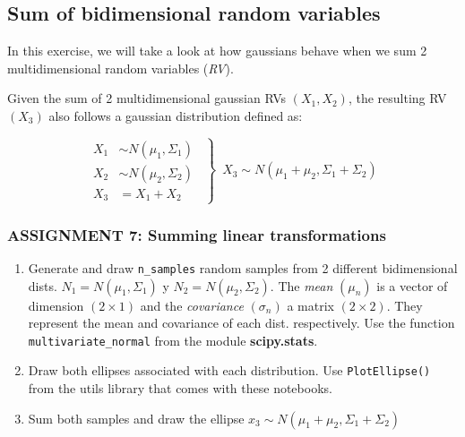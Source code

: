 \documentclass[11pt]{article}
\providecommand{\tightlist}{%
      \setlength{\itemsep}{0pt}\setlength{\parskip}{0pt}}
\begin{document}
    \hypertarget{sum-of-bidimensional-random-variables}{%
\subsection{Sum of bidimensional random
variables}\label{sum-of-bidimensional-random-variables}}

In this exercise, we will take a look at how gaussians behave when we
sum 2 multidimensional random variables (\emph{RV}).

Given the sum of 2 multidimensional gaussian RVs \((X_1, X_2)\), the
resulting RV \((X_3)\) also follows a gaussian distribution defined as:

\[
    \left.
    \begin{aligned}
    X_1 &\sim N(\mu_1, \Sigma_1) \\
    X_2 &\sim N(\mu_2, \Sigma_2) \\
    X_3 &= X_1 + X_2
    \end{aligned}
    \enspace\right\}\enspace 
    X_3 \sim N(\mu_1 + \mu_2, \Sigma_1 + \Sigma_2)
\]

    \hypertarget{assignment-7-summing-linear-transformations}{%
\subsubsection{\texorpdfstring{\textbf{{ASSIGNMENT 7: Summing linear
transformations}}}{ASSIGNMENT 7: Summing linear transformations}}\label{assignment-7-summing-linear-transformations}}

\begin{enumerate}
\def\labelenumi{\arabic{enumi}.}
\tightlist
\item
  Generate and draw \texttt{n\_samples} random samples from 2 different
  bidimensional dists. \(N_1=N(\mu_1,\Sigma_1)\) y
  \(N_2=N(\mu_2,\Sigma_2)\). The \emph{mean} \((\mu_n)\) is a vector of
  dimension \((2 \times 1)\) and the \emph{covariance} \((\sigma_n)\) a
  matrix \((2 \times 2)\). They represent the mean and covariance of
  each dist. respectively. Use the function
  \texttt{multivariate\_normal} from the module \textbf{scipy.stats}.
\item
  Draw both ellipses associated with each distribution. Use
  \texttt{PlotEllipse()} from the utils library that comes with these
  notebooks.
\item
  Sum both samples and draw the ellipse
  \(x_3 \sim N(\mu_1+\mu_2, \Sigma_1+\Sigma_2)\)
\end{enumerate}
\end{document}
